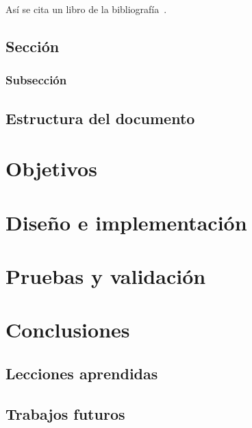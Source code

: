 \documentclass[a4paper, 12pt]{book}
\begin{document}
Así se cita un libro de la bibliografía~\cite{BuddOO}.


\section{Secci\'on}
\label{sec:seccion}

\subsection{Subsecci\'on}
\label{subsec:subseccion}

\section{Estructura del documento}
\label{sec:estructura}




\chapter{Objetivos}
\label{chap:objetivos}



\chapter{Dise\~no e implementaci\'on}
\label{chap:diseno}



\chapter{Pruebas y validaci\'on}
\label{chap:pruebas}



\chapter{Conclusiones}
\label{chap:conclusiones}


\section{Lecciones aprendidas}
\label{sec:lecciones}


\section{Trabajos futuros}
\label{sec:futuro}
\end{document}
